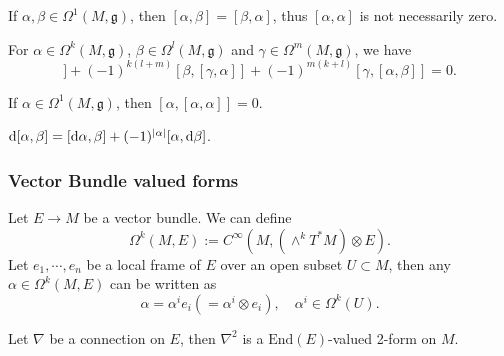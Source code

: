 \begin{example}
    If $\alpha,\beta\in \Omega^1(M,\mathfrak{g})$, then $[\alpha,\beta] = [\beta,\alpha]$, 
    thus $[\alpha,\alpha]$ is not necessarily zero.
\end{example}
\begin{proposition}
    For $\alpha\in \Omega^k(M,\mathfrak{g})$, $\beta\in \Omega^l(M,\mathfrak{g})$ and $\gamma\in \Omega^m(M,\mathfrak{g})$, we have
    \begin{equation*}
        [\alpha,[\beta,\gamma]] + (-1)^{k(l+m)}[\beta,[\gamma,\alpha]] + (-1)^{m(k+l)}[\gamma,[\alpha,\beta]] = 0.
    \end{equation*}
\end{proposition}
\begin{example}
    If $\alpha\in \Omega^1(M,\mathfrak{g})$, then $[\alpha,[\alpha,\alpha]] = 0$.
\end{example}
\begin{proposition}
    ${\rm d}[\alpha,\beta] = [{\rm d}\alpha,\beta] + (-1)^{|\alpha|}[\alpha,{\rm d}\beta]$.
\end{proposition}

\subsubsection*{Vector Bundle valued forms}
Let $E\to M$ be a vector bundle. We can define 
\begin{equation*}
    \Omega^k(M,E) := C^\infty(M, (\wedge^k T^*M)\otimes E).
\end{equation*}
Let $e_1,\cdots,e_n$ be a local frame of $E$ over an open subset $U\subset M$, 
then any $\alpha\in \Omega^k(M,E)$ can be written as 
\begin{equation*}
    \alpha = \alpha^ie_i(=\alpha^i\otimes e_i), \quad \alpha^i\in \Omega^k(U).
\end{equation*}
\begin{example}
    Let $\nabla$ be a connection on $E$, then $\nabla^2$ is a $\mathrm{End}(E)$-valued 2-form on $M$.
\end{example}


